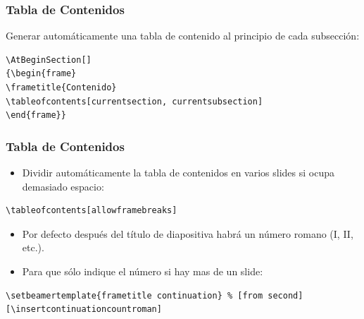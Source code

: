 \documentclass[aspectratio=1610]{beamer}%
\begin{document}
\begin{frame}[fragile]
\frametitle{\textbf{Tabla de Contenidos}}
\justifying
 Generar automáticamente una tabla de contenido al principio de cada subsección:
\begin{block}{}
   \lstset{language=}%
   \vspace{-0.7cm}
\begin{lstlisting}
\AtBeginSection[]
{\begin{frame}
\frametitle{Contenido}
\tableofcontents[currentsection, currentsubsection]
\end{frame}}
\end{lstlisting}\vspace{-0.3cm}
\end{block}

\end{frame}

\begin{frame}[fragile]
\frametitle{\textbf{Tabla de Contenidos}}
\justifying
 \begin{itemize}\justifying
  \item Dividir automáticamente la tabla de contenidos en varios slides si ocupa demasiado espacio:
\end{itemize}
\begin{block}{}
   \lstset{language=}%
   \vspace{-0.7cm}
\begin{lstlisting}
\tableofcontents[allowframebreaks]
\end{lstlisting}\vspace{-0.3cm}

\end{block}\begin{itemize}\justifying
  \item Por defecto después del título de diapositiva habrá un número romano (I, II, etc.).
  \item Para que sólo indique el número si hay mas de un slide:
\end{itemize}
\begin{block}{}
   \lstset{language=}%
   \vspace{-0.7cm}
\begin{lstlisting}
\setbeamertemplate{frametitle continuation} % [from second] [\insertcontinuationcountroman]
\end{lstlisting}\vspace{-0.3cm}

\end{block}
\end{frame}
\end{document}
